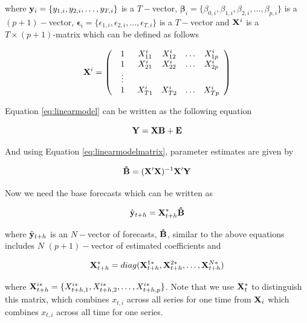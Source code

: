\documentclass[11pt,a4paper,]{article}
\begin{document}
where \({\bf{y}}_i = \{y_{1,i}, y_{2,i}, \dots, y_{T,i}\}\) is a
\(T-\)vector,
\({\bm{\beta}}_i = \{\beta_{0,i}, \beta_{1,i}, \beta_{2,i}, \dots, \beta_{p,i}\}\)
is a \((p+1)-\)vector,
\({\bm{\epsilon}}_i = \{\epsilon_{1,i}, \epsilon_{2,i}, \dots, \epsilon_{T,i}\}\)
is a \(T-\)vector and \({\bf{X}}^i\) is a \(T\times (p+1)\)-matrix which
can be defined as follows

\begin{equation}
{\bf{X}}^i = \left(\begin{array}{ccccc} 
1 & X_{11}^{i} & X_{12}^{i} & \dots & X_{1p}^{i}\\
1 & X_{21}^{i} & X_{22}^{i} & \dots & X_{2p}^{i}\\
\vdotswithin{\ldots}\\
1 & X_{T1}^{i} & X_{T2}^{i} & \dots & X_{Tp}^{i}\\
\end{array}\right)
\end{equation}

Equation \eqref{eq:linearmodel} can be written as the following equation

\begin{equation}\label{eq:linearmodelmatrix}
{\bf Y}= {\bf X} {\bf B} + {\bf E}
\end{equation}

And using Equation \eqref{eq:linearmodelmatrix}, parameter estimates are
given by

\begin{equation}
{\bf \hat B} = ({\bf X' X})^{-1} {\bf X' Y}
\end{equation}

Now we need the base forecasts which can be written as

\begin{equation}\label{eq:baseforecats}
{\hat{\bf y}}_{t+h} = {\bf X}_{t+h}^* {\bf \hat B}
\end{equation}

where \({\hat{\bf y}}_{t+h}\) is an \(N-\)vector of forecasts,
\({\bf \hat B}\), similar to the above equations includes \(N\)
\((p+1)-\)vector of estimated coefficients and

\begin{equation}
{\bf X}_{t+h}^* 
= diag({\bf X}^{1*}_{t+h}, {\bf X}^{2*}_{t+h}, \dots, {\bf X}^{N*}_{t+h})
\end{equation}

where
\({\bf X}^{i*}_{t+h} = \{ X^{i*}_{t+h,1}, X^{i*}_{t+h,2}, \dots, X^{i*}_{t+h,p}\}\).
Note that we use \({\bf X}^*_t\) to distinguish this matrix, which
combines \(x_{t,i}\) across all series for one time from \({\bf X}_i\)
which combines \(x_{t,i}\) across all time for one series.
\end{document}
